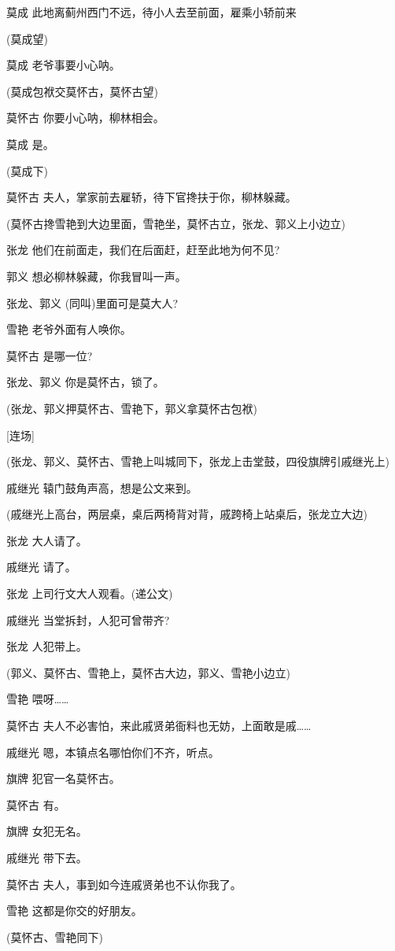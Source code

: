 莫成 此地离蓟州西门不远，待小人去至前面，雇乘小轿前来

(莫成望)

莫成 老爷事要小心呐。

(莫成包袱交莫怀古，莫怀古望)

莫怀古 你要小心呐，柳林相会。

莫成 是。

(莫成下)

莫怀古 夫人，掌家前去雇轿，待下官搀扶于你，柳林躲藏。

(莫怀古搀雪艳到大边里面，雪艳坐，莫怀古立，张龙、郭义上小边立)

张龙 他们在前面走，我们在后面赶，赶至此地为何不见?

郭义 想必柳林躲藏，你我冒叫一声。

张龙、郭义 (同叫)里面可是莫大人?

雪艳 老爷外面有人唤你。

莫怀古 是哪一位?

张龙、郭义 你是莫怀古，锁了。

(张龙、郭义押莫怀古、雪艳下，郭义拿莫怀古包袱)

{[}连场{]}

(张龙、郭义、莫怀古、雪艳上叫城同下，张龙上击堂鼓，四役旗牌引戚继光上)

戚继光 辕门鼓角声高，想是公文来到。

(戚继光上高台，两层桌，桌后两椅背对背，戚跨椅上站桌后，张龙立大边)

张龙 大人请了。

戚继光 请了。

张龙 上司行文大人观看。(递公文)

戚继光 当堂拆封，人犯可曾带齐?

张龙 人犯带上。

(郭义、莫怀古、雪艳上，莫怀古大边，郭义、雪艳小边立)

雪艳 喂呀\ldots{}\ldots{}

莫怀古 夫人不必害怕，来此戚贤弟衙料也无妨，上面敢是戚\ldots{}\ldots{}

戚继光 嗯，本镇点名哪怕你们不齐，听点。

旗牌 犯官一名莫怀古。

莫怀古 有。

旗牌 女犯无名。

戚继光 带下去。

莫怀古 夫人，事到如今连戚贤弟也不认你我了。

雪艳 这都是你交的好朋友。

(莫怀古、雪艳同下)

